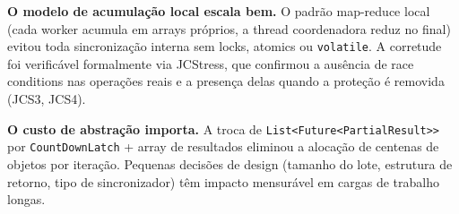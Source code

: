 \textbf{O modelo de acumulação local escala bem.}
O padrão map-reduce local (cada worker acumula em arrays próprios, a thread
coordenadora reduz no final) evitou toda sincronização interna sem locks, atomics
ou \texttt{volatile}. A corretude foi verificável formalmente via JCStress, que
confirmou a ausência de race conditions nas operações reais e a presença delas
quando a proteção é removida (JCS3, JCS4).

\textbf{O custo de abstração importa.}
A troca de \texttt{List<Future<PartialResult>>} por \texttt{CountDownLatch} + array
de resultados eliminou a alocação de centenas de objetos por iteração. Pequenas
decisões de design (tamanho do lote, estrutura de retorno, tipo de sincronizador)
têm impacto mensurável em cargas de trabalho longas.
